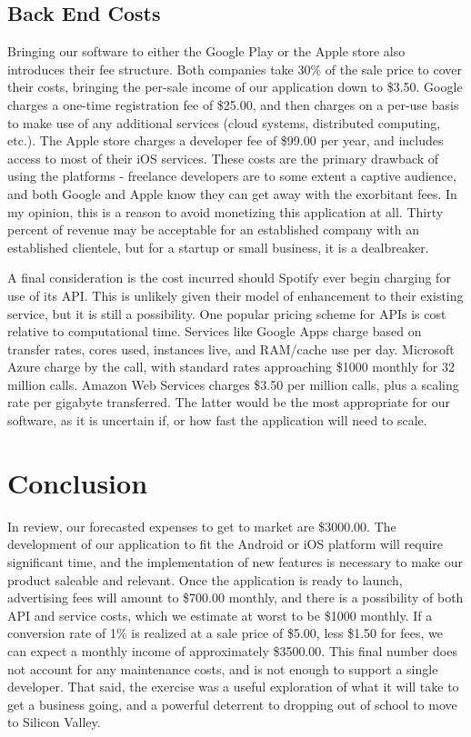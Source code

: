 \documentclass{roffin}
\begin{document}
\subsection{Back End Costs}
Bringing our software to either the Google Play or the Apple store also introduces their fee structure.  Both companies take 30\% of the sale price to cover their costs, bringing the per-sale income of our application down to \$3.50.  Google charges a one-time registration fee of \$25.00, and then charges on a per-use basis to make use of any additional services (cloud systems, distributed computing, etc.).  The Apple store charges a developer fee of \$99.00 per year, and includes access to most of their iOS services.  These costs are the primary drawback of using the platforms - freelance developers are to some extent a captive audience, and both Google and Apple know they can get away with the exorbitant fees.  In my opinion, this is a reason to avoid monetizing this application at all.  Thirty percent of revenue may be acceptable for an established company with an established clientele, but for a startup or small business, it is a dealbreaker.

A final consideration is the cost incurred should Spotify ever begin charging for use of its API.  This is unlikely given their model of enhancement to their existing service, but it is still a possibility.  One popular pricing scheme for APIs is cost relative to computational time.  Services like Google Apps charge based on transfer rates, cores used, instances live, and RAM/cache use per day.  Microsoft Azure charge by the call, with standard rates approaching \$1000 monthly for 32 million calls.  Amazon Web Services charges \$3.50 per million calls, plus a scaling rate per gigabyte transferred.  The latter would be the most appropriate for our software, as it is uncertain if, or how fast the application will need to scale.


\section{Conclusion}
In review, our forecasted expenses to get to market are \$3000.00.  The development of our application to fit the Android or iOS platform will require significant time, and the implementation of new features is necessary to make our product saleable and relevant.  Once the application is ready to launch, advertising fees will amount to \$700.00 monthly, and there is a possibility of both API and service costs, which we estimate at worst to be \$1000 monthly.  If a conversion rate of 1\% is realized at a sale price of \$5.00, less \$1.50 for fees, we can expect a monthly income of approximately \$3500.00.  This final number does not account for any maintenance costs, and is not enough to support a single developer.  That said, the exercise was a useful exploration of what it will take to get a business going, and a powerful deterrent to dropping out of school to move to Silicon Valley.
\end{document}
